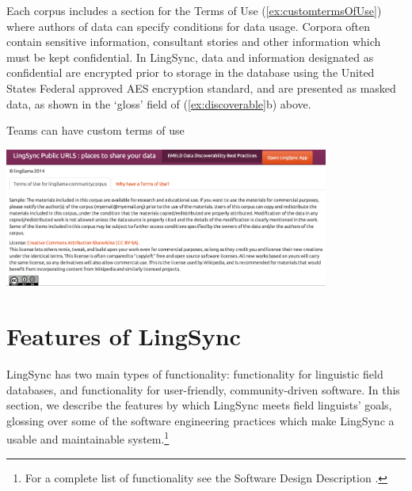 \documentclass[letterpaper, 12pt, dvips]{mitwpl}
\begin{document}
Each corpus includes a section for the Terms of Use (\ref{ex:customtermsOfUse}) where authors of data can specify conditions for data usage. 
Corpora often contain sensitive information, consultant stories and other information which must be kept confidential. 
In LingSync, data and information designated as confidential are encrypted prior to storage in the database using the United States Federal approved AES encryption standard, and are presented as masked data, as shown in the `gloss' field of (\ref{ex:discoverable}b) above. 



\begin{exe} 
\ex Teams can have custom terms of use

 \centering
   \includegraphics[width=0.8\textwidth]{customtermsOfUse}

\label{ex:customtermsOfUse}
\end{exe}






\section{Features of LingSync}
\label{sec:what}

LingSync has two main types of functionality: functionality for linguistic field databases, 
and functionality for user-friendly, community-driven software.
In this section, we describe the features by which LingSync meets field linguists' goals, glossing over some of the software engineering practices which make LingSync a usable and maintainable system.\footnote{For a complete list of functionality see the Software Design Description \citep{LingSync:2012:SDD}. } 
\end{document}
